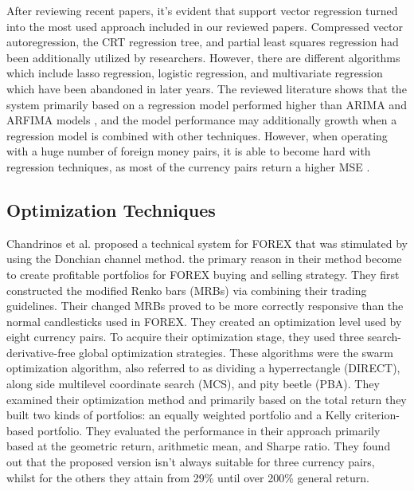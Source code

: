 After reviewing recent papers, it's evident that support vector regression turned into the most used approach included in our reviewed papers. Compressed vector autoregression, the CRT regression tree, and partial least squares regression had been additionally utilized by researchers. However, there are different algorithms which include lasso regression, logistic regression, and multivariate regression which have been abandoned in later years. 
The reviewed literature shows that the system primarily based on a regression model performed higher than ARIMA and ARFIMA models \cite{Raimundo18}, and the model performance may additionally growth \cite{Achchab17} when a regression model is combined with other techniques. However, when operating with a huge number of foreign money pairs, it is able to become hard with regression techniques, as most of the currency pairs return a higher MSE \citep{Taveeapiradeecharoen19}.

\subsection{Optimization Techniques}
Chandrinos et al. \cite{Chandrinos18} proposed a technical system for FOREX that was stimulated by using the Donchian channel method. the primary reason in their method become to create profitable portfolios for FOREX buying and selling strategy. They first constructed the modified Renko bars (MRBs) via combining their trading guidelines. Their changed MRBs proved to be more correctly responsive than the normal candlesticks used in FOREX. They created an optimization level used by eight currency pairs.  To acquire their optimization stage, they used three search-derivative-free global optimization strategies. These algorithms were the swarm optimization algorithm, also referred to as dividing a hyperrectangle (DIRECT), along side multilevel coordinate search (MCS), and pity beetle (PBA). They examined their optimization method and primarily based on the total return they built two kinds of portfolios: an equally weighted portfolio and a Kelly criterion-based portfolio. They evaluated the performance in their approach primarily based at the geometric return, arithmetic mean, and Sharpe ratio. They found out that the proposed version isn't always suitable for three currency pairs, whilst for the others they attain from 29\% until over 200\% general return.

